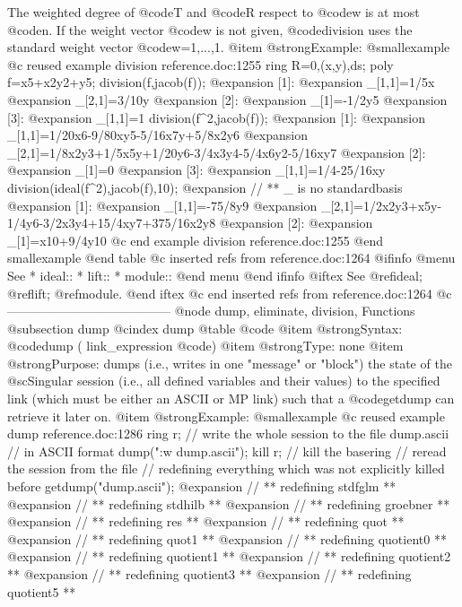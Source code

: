 The weighted degree of @code{T} and @code{R} respect to @code{w} is at most @code{n}.
If the weight vector @code{w} is not given, @code{division} uses the standard weight vector @code{w=1,...,1}.
@item @strong{Example:}
@smallexample
@c reused example division reference.doc:1255 
ring R=0,(x,y),ds;
poly f=x5+x2y2+y5;
division(f,jacob(f));
@expansion{} [1]:
@expansion{}    _[1,1]=1/5x
@expansion{}    _[2,1]=3/10y
@expansion{} [2]:
@expansion{}    _[1]=-1/2y5
@expansion{} [3]:
@expansion{}    _[1,1]=1
division(f^2,jacob(f));
@expansion{} [1]:
@expansion{}    _[1,1]=1/20x6-9/80xy5-5/16x7y+5/8x2y6
@expansion{}    _[2,1]=1/8x2y3+1/5x5y+1/20y6-3/4x3y4-5/4x6y2-5/16xy7
@expansion{} [2]:
@expansion{}    _[1]=0
@expansion{} [3]:
@expansion{}    _[1,1]=1/4-25/16xy
division(ideal(f^2),jacob(f),10);
@expansion{} // ** _ is no standardbasis
@expansion{} [1]:
@expansion{}    _[1,1]=-75/8y9
@expansion{}    _[2,1]=1/2x2y3+x5y-1/4y6-3/2x3y4+15/4xy7+375/16x2y8
@expansion{} [2]:
@expansion{}    _[1]=x10+9/4y10
@c end example division reference.doc:1255
@end smallexample
@end table
@c inserted refs from reference.doc:1264
@ifinfo
@menu
See
* ideal::
* lift::
* module::
@end menu
@end ifinfo
@iftex
See
@ref{ideal};
@ref{lift};
@ref{module}.
@end iftex
@c end inserted refs from reference.doc:1264
@c ---------------------------------------
@node dump, eliminate, division, Functions
@subsection dump
@cindex dump
@table @code
@item @strong{Syntax:}
@code{dump (} link_expression @code{)}
@item @strong{Type:}
none
@item @strong{Purpose:}
dumps (i.e., writes in one "message" or "block") the state of the @sc{Singular}
session (i.e., all defined variables and their values) to the specified
link (which must be either an ASCII or MP link) such that a
@code{getdump} can retrieve it later on.
@item @strong{Example:}
@smallexample
@c reused example dump reference.doc:1286 
  ring r;
  // write the whole session to the file dump.ascii
  // in ASCII format
  dump(":w dump.ascii");
  kill r;                  // kill the basering
  // reread the session from the file
  // redefining everything which was not explicitly killed before
  getdump("dump.ascii");
@expansion{} // ** redefining stdfglm **
@expansion{} // ** redefining stdhilb **
@expansion{} // ** redefining groebner **
@expansion{} // ** redefining res **
@expansion{} // ** redefining quot **
@expansion{} // ** redefining quot1 **
@expansion{} // ** redefining quotient0 **
@expansion{} // ** redefining quotient1 **
@expansion{} // ** redefining quotient2 **
@expansion{} // ** redefining quotient3 **
@expansion{} // ** redefining quotient5 **
